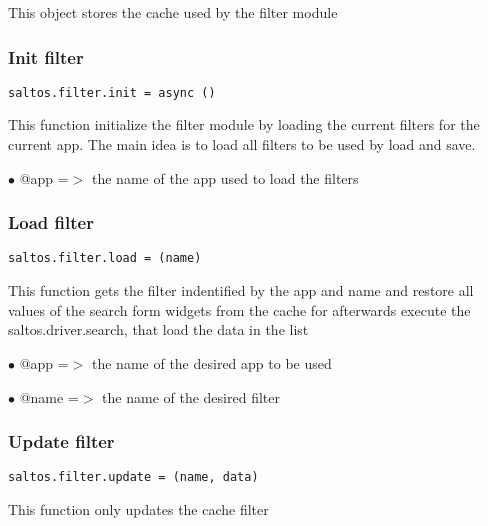 \documentclass[a4paper]{article}
\begin{document}
This object stores the cache used by the filter module

\hypertarget{toc767}{}
\subsubsection{Init filter}

\begin{lstlisting}
saltos.filter.init = async ()
\end{lstlisting}

This function initialize the filter module by loading the current filters for
the current app. The main idea is to load all filters to be used by load and
save.

\begin{compactitem}
\item[\color{myblue}$\bullet$] @app =$>$ the name of the app used to load the filters
\end{compactitem}

\hypertarget{toc768}{}
\subsubsection{Load filter}

\begin{lstlisting}
saltos.filter.load = (name)
\end{lstlisting}

This function gets the filter indentified by the app and name and restore
all values of the search form widgets from the cache for afterwards execute
the saltos.driver.search, that load the data in the list

\begin{compactitem}
\item[\color{myblue}$\bullet$] @app  =$>$ the name of the desired app to be used
\item[\color{myblue}$\bullet$] @name =$>$ the name of the desired filter
\end{compactitem}

\hypertarget{toc769}{}
\subsubsection{Update filter}

\begin{lstlisting}
saltos.filter.update = (name, data)
\end{lstlisting}

This function only updates the cache filter
\end{document}
